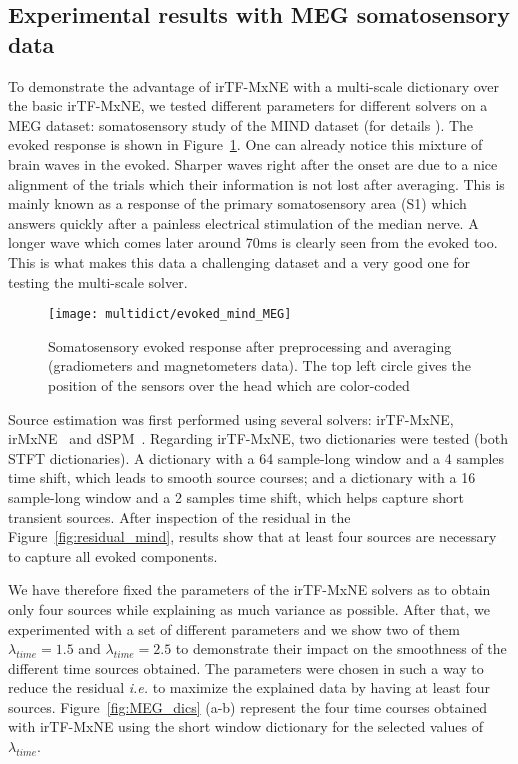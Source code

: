 \subsection{Experimental results with MEG somatosensory data}
To demonstrate the advantage of irTF-MxNE with a multi-scale dictionary over the basic irTF-MxNE, we tested different parameters for different solvers on a MEG dataset: somatosensory study of the MIND dataset (for details \cite{weisend2007paving}). The evoked response is shown in Figure~\ref{fig:evoked_mind}. One can already notice this mixture of brain waves in the evoked. Sharper waves right after the onset are due to a nice alignment of the trials which their information is not lost after averaging. This is mainly known as a response of the primary somatosensory area (S1) which answers quickly after a painless electrical stimulation of the median nerve. A longer wave which comes later around 70ms is clearly seen from the evoked too. This is what makes this data a challenging dataset and a very good one for testing the multi-scale solver.

\begin{figure}
\centering
	\texttt{[image: multidict/evoked\_mind\_MEG]}
    \caption{Somatosensory evoked response after preprocessing and averaging (gradiometers and magnetometers data). The top left circle gives the position of the sensors over the head which are color-coded}
    \label{fig:evoked_mind}
\end{figure}

Source estimation was first performed using several solvers: irTF-MxNE, irMxNE~\cite{strohmeier2014iterative} and dSPM~\cite{dale2000dynamic}. Regarding irTF-MxNE, two dictionaries were tested (both STFT dictionaries). A dictionary with a 64 sample-long window and a 4 samples time shift, which leads to smooth source courses; and a dictionary with a 16 sample-long window and a 2 samples time shift, which helps capture short transient sources. After inspection of the residual in the Figure~\ref{fig:residual_mind}, results show that at least four sources are necessary to capture all evoked components. 

We have therefore fixed the parameters of the irTF-MxNE solvers as to obtain only four sources while explaining as much variance as possible. After that, we experimented with a set of different parameters and we show two of them $\lambda_{time}=1.5$ and $\lambda_{time}=2.5$ to demonstrate their impact on the smoothness of the different time sources obtained.
The parameters were chosen in such a way to reduce the residual \textit{i.e.} to maximize the explained data by having at least four sources. 
Figure~\ref{fig:MEG_dics} (a-b) represent the four time courses obtained with irTF-MxNE using the short window dictionary for the selected values of $\lambda_{time}$.

